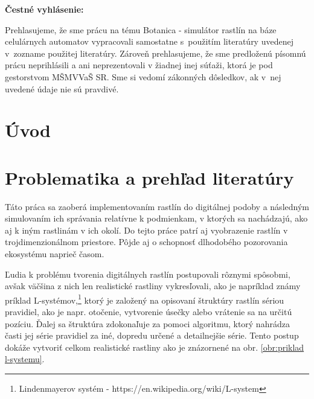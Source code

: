 \documentclass[12pt]{article}
\def\nazovprace{Botanica - simulátor rastlín na báze celulárnych automatov}
\begin{document}
\setcounter{page}{3}

%
%

\thispagestyle{empty}

\noindent
\textbf{Čestné vyhlásenie:}

\noindent
Prehlasujeme, že sme prácu na tému
\nazovprace \space
vypracovali samostatne s~použitím literatúry uvedenej v~zozname použitej literatúry.
Zároveň prehlasujeme, že sme predloženú písomnú prácu neprihlásili a ani neprezentovali
v žiadnej inej súťaži, ktorá je pod gestorstvom MŠMVVaŠ SR. Sme si vedomí zákonných dôsledkov,
ak v~nej uvedené údaje nie sú pravdivé.

\newpage


%
%

% 
% 
% 
% 


%
%

\thispagestyle{empty}
\tableofcontents

%
%

\section*{Úvod}

\section{Problematika a prehľad literatúry}

Táto práca sa zaoberá implementovaním rastlín do digitálnej podoby a následným
simulovaním ich správania relatívne k podmienkam, v ktorých sa nachádzajú,
ako aj k iným rastlinám v ich okolí. Do tejto práce patrí aj vyobrazenie
rastlín v trojdimenzionálnom priestore. Pôjde aj o schopnosť dlhodobého
pozorovania ekosystému naprieč časom.

Ľudia k problému tvorenia digitálnych rastlín postupovali rôznymi spôsobmi,
avšak väčšina z nich len realistické rastliny vykresľovali, ako je napríklad
známy príklad L-systémov,\footnote{
	Lindenmayerov systém - https://en.wikipedia.org/wiki/L-system
	}
ktorý je založený na opisovaní štruktúry rastlín
sériou pravidiel, ako je napr. otočenie, vytvorenie úsečky alebo
vrátenie sa na určitú pozíciu. Ďalej sa štruktúra zdokonaľuje za pomoci
algoritmu, ktorý nahrádza časti jej série pravidiel za iné, dopredu určené
a detailnejšie série. Tento postup dokáže vytvoriť celkom realistické rastliny
ako je znázornené na obr. \ref{obr:priklad l-systemu}.
\end{document}
